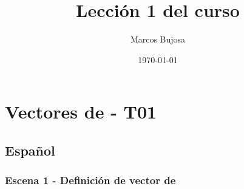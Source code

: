 \documentclass[11pt]{article}
\author{Marcos Bujosa}
\date{\today}
\title{Lección 1 del curso}
\begin{document}
\tableofcontents

\maketitle

\section{Vectores de \R[n] - T01}
\label{sec:org6b69d6d}


\subsection{Español}
\label{sec:orgafe8c69}


\subsubsection{Escena 1 - Definición de vector de \R[n]}
\label{sec:org29bd9e2}
\end{document}
